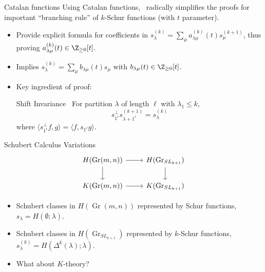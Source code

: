 \documentclass{beamer}
\DeclareMathOperator{\Gr}{Gr}
\begin{document}
\begin{frame}{Catalan functions}
  Using Catalan functions,~\cite{catalans} radically simplifies the
  proofs for important ``branching rule'' of \(k\)-Schur functions (with
  \(t\) parameter).
  \begin{itemize}
  \item Provide explicit formula for coefficients in
    \(s_\lambda^{(k)} = \sum_\mu a_{\lambda \mu}^{(k)}(t) s_\mu^{(k+1)}\),
    thus proving \(a_{\lambda \mu}^{(k)}(t) \in \Z_{\geq 0}[t]\).
  \item Implies \(s_\lambda^{(k)} = \sum_\mu b_{\lambda \mu}(t)
    s_\mu\) with \(b_{\lambda \mu}(t) \in \Z_{\geq 0}[t]\).
  \item Key ingredient of proof:
    \begin{block}{Shift Invariance~\cite{catalans}}
      For partition \(\lambda\) of length \(\ell\) with \(\lambda_1
      \leq k\),
      \[
        s_{1^\ell}^\perp s_{\lambda+1^\ell}^{(k+1)} = s_\lambda^{(k)}
      \]
      where
      \(\langle s_{1^\ell}^\perp f, g \rangle = \langle f, s_{1^\ell}
      g \rangle\).
    \end{block}
  \end{itemize}
\end{frame}
\begin{frame}[fragile]{Schubert Calculus Variations}
      \[
      \begin{tikzcd}
        H(\Gr(m,n)) \ar[d] \ar[r]& H(\Gr_{SL_{k+1}}) \ar[d] \\
        K(\Gr(m,n)) \ar[r] & K(\Gr_{SL_{k+1}})
      \end{tikzcd}
    \]
    \begin{itemize}
    \item Schubert classes in \(H(\Gr(m,n))\) represented by Schur
      functions, \(s_\lambda = H(\emptyset;\lambda)\).
    \item Schubert classes in \(H(\Gr_{SL_{k+1}})\) represented by
      \(k\)-Schur functions, \(s_\lambda^{(k)} = H(\Delta^k(\lambda);\lambda)\).
    \item What about \(K\)-theory?
    \end{itemize}
  \end{frame}
\end{document}
